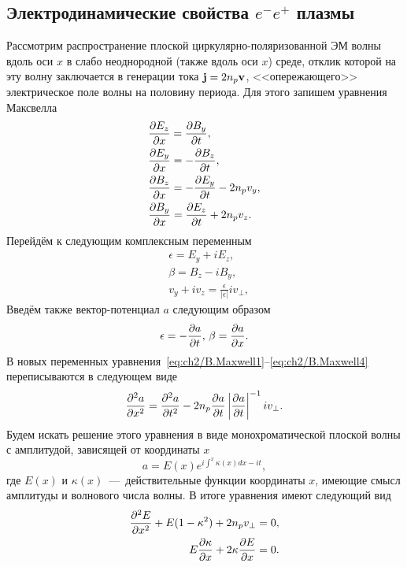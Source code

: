 \subsection{Электродинамические свойства $e^-e^+$ плазмы}
\label{app.Electrodynamics}

Рассмотрим распространение плоской циркулярно-поляризованной ЭМ волны вдоль оси $x$ в слабо неоднородной (также вдоль оси $x$) среде, отклик которой на эту волну заключается в генерации тока $\vb{j}=2n_p\vb{v}$, <<опережающего>> электрическое поле волны на половину периода.
Для этого запишем уравнения Максвелла
\begin{align}
    \label{eq:ch2/B.Maxwell1}
    &\pdv{ E_z}{ x} = \pdv{ B_y}{ t}, \\
    \label{eq:ch2/B.Maxwell2}
    &\pdv{ E_y}{ x} = -\pdv{ B_z}{ t}, \\
    \label{eq:ch2/B.Maxwell3}
    &\pdv{ B_z}{ x} = -\pdv{ E_y}{ t} - 2 n_p v_y, \\
    \label{eq:ch2/B.Maxwell4}
    &\pdv{ B_y}{ x} = \pdv{ E_z}{ t} + 2 n_p v_z.
\end{align}
Перейдём к следующим комплексным переменным
\begin{align}
    &\epsilon=E_y+iE_z, 
    \label{eps} \\
    &\beta=B_z-iB_y, \\
    &v_y+iv_z=\frac{\epsilon}{|\epsilon|}iv_{\perp} ,
\end{align}
Введём также вектор-потенциал $a$ следующим образом
\begin{equation}
    \epsilon=-\pdv{ a}{ t} \text{, } \beta=\pdv{ a}{ x}.
\end{equation}
В новых переменных уравнения~\eqref{eq:ch2/B.Maxwell1}--\eqref{eq:ch2/B.Maxwell4} переписываются в следующем виде
\begin{equation}
    \pdv[2]{ a}{ x}=\pdv[2]{ a}{ t}-2 n_p \pdv{ a}{ t}\left| \pdv{ a}{ t} \right|^{-1} iv_\perp.
\end{equation}
Будем искать решение этого уравнения в виде монохроматической плоской волны с амплитудой, зависящей от координаты $x$
\begin{equation}
    a=E(x)e^{i\int^{x}\kappa(x)dx-it},
    \label{a}
\end{equation}
где $E(x)$ и $\kappa(x)$~---~действительные функции координаты $x$, имеющие смысл амплитуды и волнового числа волны.
В итоге уравнения имеют следующий вид
\begin{align}
    \label{eq:ch2/B.Cushion1}
    \pdv[2]{ E}{ x}+E(1-\kappa^2)+2 n_p v_{\perp} =0, \\
    \label{eq:ch2/B.Cushion2}
    E \pdv{ \kappa}{ x} + 2\kappa \pdv{ E}{ x} = 0.
\end{align}
